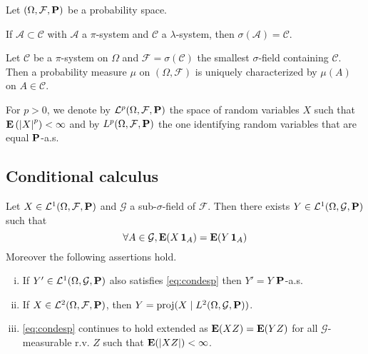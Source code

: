 Let $(\Omega, \mathcal{F}, \mathbf{P})$ be a probability space.

\begin{thm}
	If $\mathcal{A} \subset \mathcal{C}$ with $\mathcal{A}$ a $\pi$-system and $\mathcal{C}$ a $\lambda$-system, then $\sigma(\mathcal{A}) = \mathcal{C}$.
\end{thm}

\begin{thm}
	Let $\mathcal{C}$ be a $\pi$-system on $\Omega$ and $\mathcal{F} = \sigma(\mathcal{C})$ the smallest $\sigma$-field containing $\mathcal{C}$.
	Then a probability measure $\mu$ on $(\Omega, \mathcal{F})$ is uniquely characterized by $\mu(A)$ on $A \in \mathcal{C}$.
\end{thm}

\begin{note}
	For $p > 0$, we denote by $\mathcal{L}^p(\Omega, \mathcal{F}, \mathbf{P})$ the space of random variables $X$ such that $\mathbf{E} \left( \left\lvert X\right\rvert^p \right) < \infty$ and by $L^p(\Omega, \mathcal{F}, \mathbf{P})$ the one identifying random variables that are equal $\mathbf{P}$-a.s.
\end{note}

\subsection{Conditional calculus}

	\begin{lem}
		Let $X \in \mathcal{L}^1(\Omega, \mathcal{F}, \mathbf{P})$ and $\mathcal{G}$ a sub-$\sigma$-field of $\mathcal{F}$.
		Then there exists $Y \in \mathcal{L}^1(\Omega, \mathcal{G}, \mathbf{P})$ such that
		\begin{equation}\label{eq:condesp}
			\forall A \in \mathcal{G}, \mathbf{E}(X \operatorname{\mathbf{1}}_A) = \mathbf{E}(Y \operatorname{\mathbf{1}}_A)
		\end{equation}
		Moreover the following assertions hold.
		\begin{enumerate}[(i)]
			\item If $Y' \in \mathcal{L}^1(\Omega, \mathcal{G}, \mathbf{P})$ also satisfies \eqref{eq:condesp} then $Y' = Y$ $\mathbf{P}$-a.s.
			\item If $X \in \mathcal{L}^2(\Omega, \mathcal{F}, \mathbf{P})$, then $Y = \operatorname{proj}(X \mid L^2(\Omega, \mathcal{G}, \mathbf{P}))$.
			\item \eqref{eq:condesp} continues to hold extended as $\mathbf{E}(XZ) = \mathbf{E}(YZ)$ for all $\mathcal{G}$-measurable r.v. $Z$ such that $\mathbf{E}(\left\lvert XZ\right\rvert) < \infty$.
		\end{enumerate}
	\end{lem}

